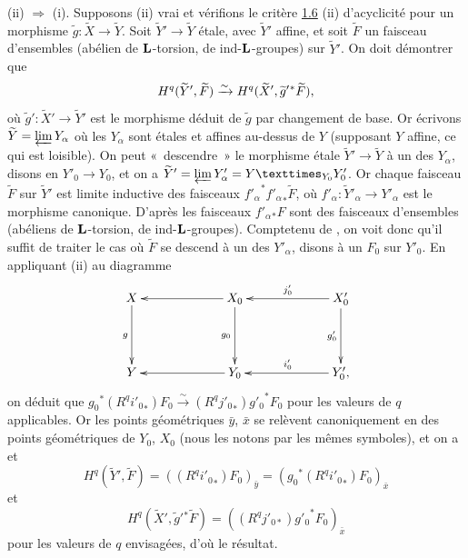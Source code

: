 \documentclass[10pt]{../fichiers-configuration-latex/smfart}
\begin{document}
(ii) $\Rightarrow$ (i). Supposons (ii) vrai et vérifions le critère
\hyperref[XV.prop1.6]{1.6} (ii) d'acyclicité pour un morphisme
$\widetilde{g}:\widetilde{X}\rightarrow \widetilde{Y}$. Soit
$\widetilde{Y}'\rightarrow \widetilde{Y}$ étale, avec $\widetilde{Y}'$
affine, et soit $\widetilde{F}$ un faisceau d'ensembles (\resp abélien
de $\mathbf{L}$-torsion, \resp de ind-$\mathbf{L}$-groupes) sur
$\widetilde{Y}'$. On doit démontrer que
$$
H^{q}(\widetilde{Y}',\widetilde{F})\xrightarrow{\sim}
H^{q}(\widetilde{X}', \widetilde{g}'{}^{\ast}\widetilde{F}){},
$$
où $\widetilde{g}':\widetilde{X}'\rightarrow \widetilde{Y}'$ est le
morphisme déduit de $\widetilde{g}$ par changement de base. Or
écrivons $\widetilde{Y}=\varprojlim Y_{\alpha}$ où les $Y_{\alpha}$
sont étales et affines au-dessus de $Y$ (supposant $Y$ affine, ce qui
est loisible). On peut « descendre »  le morphisme étale
$\widetilde{Y}'\rightarrow \widetilde{Y}$ à un des $Y_{\alpha}$,
disons en $Y'_{0}\rightarrow Y_{0}$, et on a
$\widetilde{Y}'=\varprojlim
Y'_{\alpha}=\fprod{Y}{Y'_{0}}{Y_{0}}$. Or chaque faisceau
$\widetilde{F}$ sur $\widetilde{Y}'$ est limite inductive des
faisceaux ${f'_{\alpha}}^{\ast}{f'_{\alpha}}_{\ast}\widetilde{F}$, où
$f'_{\alpha}:\widetilde{Y}'_{\alpha}\rightarrow Y'_{\alpha}$ est le
morphisme canonique. D'après  les faisceaux
$f'_{\alpha}{}_{\ast}F$ sont des faisceaux d'ensembles (\resp abéliens
de $\mathbf{L}$-torsion, \resp de
ind-$\mathbf{L}$-groupes). Compte\pageoriginale tenu de ,
on voit donc qu'il suffit de traiter le cas où $\widetilde{F}$ se descend
à un des $Y'_{\alpha}$, disons à un $F_{0}$ sur $Y'_{0}$. En
appliquant (ii) au diagramme
$$
\xymatrix@C=2.25cm@R=1.5cm{
X \ar[d]_{g}& X_0 \ar[l] \ar[d]_{g_0}& X'_0 \ar[l]_{j'_0} \ar[d]_{g'_0}\\
Y & Y_0 \ar[l]& Y'_0 \ar[l]_{i'_0},
}
$$
on déduit que
${g_{0}}^{\ast}(R^{q}{i'_0}_{\ast})F_{0}\xrightarrow{\sim}
(R^{q}{j'_0}_{\ast}){g'_0}^{\ast}F_{0}$ pour les
valeurs de $q$ applicables. Or les points géométriques $\bar{y}$,
$\bar{x}$ se relèvent canoniquement en des points géométriques de
$Y_{0}$, $X_{0}$ (nous les notons par les mêmes symboles), et
on a  et 
$$
H^{q}(\widetilde{Y}',\widetilde{F})=((R^{q}{i'_0}_{\ast})F_{0})_{\bar{y}}=({g_0}^{\ast}
(R^{q}{i'_0}_{\ast})F_0)_{\bar{x}}
$$
et
$$
H^{q}(\widetilde{X}',{\widetilde{g}'}{}^{\ast}\widetilde{F})=((R^{q}j'_{0\ast}){g'_0}^{\ast}F_{0})_{\bar{x}}
$$
pour les valeurs de $q$ envisagées, d'où le résultat.
\end{document}

